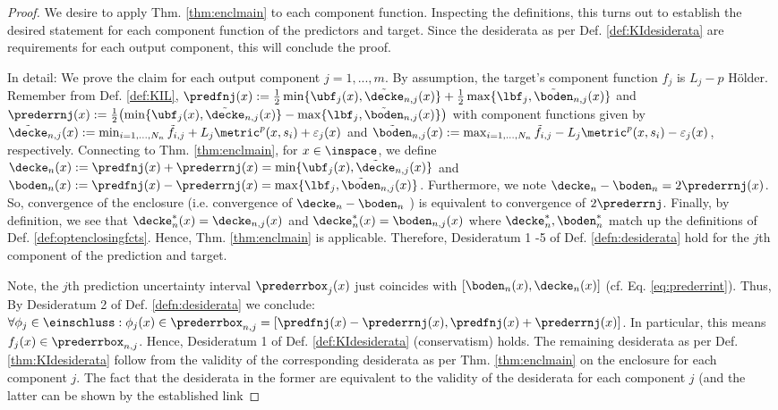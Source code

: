 \begin{proof}
We desire to apply Thm. \ref{thm:enclmain} to each component function.
Inspecting the definitions, this turns out to establish the desired statement for each component function of the predictors and target. 
Since the desiderata as per Def. \ref{def:KIdesiderata} are requirements for each output component, this will conclude the proof. 

In detail:
We prove the claim for each output component $j=1,...,m$. %
By assumption, the target's component function $f_j$ is $L_j-p$ H\"older. Remember from Def. \ref{def:KIL}, 
  $ \predfnj(x) := \frac{1}{2} \min\{ \ubf_j(x), \tilde \decke_{n,j}(x)\} + \frac{1}{2} \max\{ \lbf_j, \tilde \boden_{n,j}(x) \}$ and   
$	\prederrnj(x) := \frac{1}{2} \bigl(\min\{ \ubf_j(x), \tilde \decke_{n,j}(x)\} - \max\{ \lbf_j, \tilde \boden_{n,j}(x) \} \bigr)$
	with component functions given by
	$\tilde \decke_{n,j}(x) := \min_{i=1,\ldots,N_n}   \tilde f_{i,j} + L_j \metric^p(x,s_i) + \varepsilon_j(x)$ and 
	$\tilde \boden_{n,j}(x) := \max_{i=1,\ldots,N_n}   \tilde f_{i,j} - L_j \metric^p(x,s_i) - \varepsilon_j(x)$, respectively. 
Connecting to Thm. \ref{thm:enclmain}, for $x \in \inspace$, we define $\decke_n (x) := \predfnj(x) + \prederrnj(x) =  \min\{ \ubf_j(x), \tilde \decke_{n,j}(x) \}$ and $\boden_n (x) := \predfnj(x) - \prederrnj(x) =\max\{ \lbf_j, \tilde \boden_{n,j}(x) \} $. Furthermore, we note $\decke_n - \boden_n = 2 \prederrnj(x)$. So, convergence of the enclosure (i.e. convergence of $\decke_n - \boden_n$ ) is equivalent to convergence of $2 \prederrnj$. Finally, by definition, we see that $\decke_n^*(x) = \decke_{n,j}(x)$ and $\decke_n^*(x) = \boden_{n,j}(x)$ where $\decke^*_n, \boden^*_n$ match up the definitions of Def. \ref{def:optenclosingfcts}. 
Hence, Thm. \ref{thm:enclmain} is applicable. Therefore, Desideratum 1 -5 of Def. \ref{defn:desiderata} hold for the $j$th component of the prediction and target. 

Note, the $j$th prediction uncertainty interval $\prederrbox_j(x)$ just coincides with $[\boden_n(x), \decke_n(x)]$ (cf. Eq. \ref{eq:prederrint}). Thus, By Desideratum 2 of Def. \ref{defn:desiderata} we conclude:
$\forall \phi_j \in \einschluss : \phi_j(x) \in \prederrbox_{n,j}=[ \predfnj(x) - \prederrnj(x), \predfnj(x) + \prederrnj(x)] $.
In particular, this means $f_j(x)   \in \prederrbox_{n,j}$. Hence, Desideratum 1 of Def. \ref{def:KIdesiderata} (conservatism) holds.
The remaining desiderata as per Def. \ref{thm:KIdesiderata} follow from the validity of the corresponding desiderata as per Thm. \ref{thm:enclmain} on the enclosure for each component $j$. The fact that the desiderata in the former are equivalent to the validity of the desiderata for each component $j$ (and the latter can be shown by the established link 


\end{proof}
